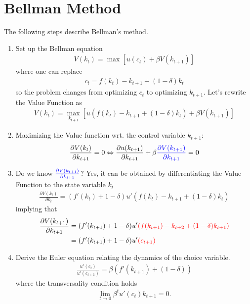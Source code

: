\documentclass[11pt,a4paper]{book}
\newcommand{\red}[1]{\textcolor{red}{#1}}
\newcommand{\blue}[1]{\textcolor{blue}{#1}}
\theoremstyle{definition}\newtheorem{definition}{Definition}
\theoremstyle{definition}\newtheorem{fact}{Fact}
\theoremstyle{definition}\newtheorem{remark}{Remark}
\theoremstyle{definition}\newtheorem{ex}{Ex.}
\theoremstyle{definition}\newtheorem{project}{Project}
\theoremstyle{definition}\newtheorem{problem}{Problem}
\theoremstyle{definition}\newtheorem{example}{Example}
\numberwithin{theorem}{section}
\numberwithin{corollary}{chapter}
\numberwithin{assumption}{chapter}
\numberwithin{definition}{chapter}
\numberwithin{prop}{chapter}
\numberwithin{notation}{chapter}
\numberwithin{problem}{chapter}
\numberwithin{example}{chapter}
\numberwithin{fact}{chapter}
\numberwithin{ex}{chapter}
\begin{document}
	\section{Bellman Method}
	The following steps describe Bellman's method.
	\begin{enumerate}
		\item Set up the Bellman equation
		\begin{align*}
			V(k_t) = \max \left[ u(c_t) + \beta V(k_{t+1}) \right]
		\end{align*}
		where one can replace
		\begin{align*}
			c_t = f(k_t) - k_{t+1} + (1-\delta) k_t
		\end{align*}
		so the problem changes from optimizing $c_t$ to optimizing $k_{t+1}$. Let's rewrite the Value Function as
		\begin{align*}
			V(k_t) = \max_{k_{t+1}} \left[ u(f(k_t) - k_{t+1} + (1-\delta)k_t) +\beta V(k_{t+1}) \right] 
		\end{align*}
		\item Maximizing the Value function wrt. the control variable $k_{t+1}$:
		\begin{align*}
			\frac{\partial V(k_t)}{\partial k_{t+1}} = 0 \Leftrightarrow \frac{\partial u(k_{t+1})}{\partial k_{t+1}} + \beta \blue{\frac{\partial V(k_{t+1})}{\partial k_{t+1}}} = 0 
		\end{align*}
		\item Do we know $\blue{\frac{\partial V(k_{t+1})}{\partial k_{t+1}}}$? Yes, it can be obtained by differentiating the Value Function to the state variable $k_t$
		\begin{align*}
			\frac{\partial V(k_t)}{\partial k_t} = (f'(k_t) + 1-\delta) u'( f(k_t) - k_{t+1} + (1-\delta)k_t ) 
		\end{align*}
		implying that
		\begin{align*}
			\frac{\partial V(k_{t+1})}{\partial k_{t+1}} &= (f'(k_{t+1}) + 1-\delta) u'\red{( f(k_{t+1}) - k_{t+2} + (1-\delta)k_{t+1} )} \\
			&= (f'(k_{t+1}) + 1-\delta)u'\red{ (c_{t+1})}
		\end{align*}
		\item Derive the Euler equation relating the dynamics of the choice variable.
		\begin{align*}
			\frac{u'(c_t)}{u'(c_{t+1})} = \beta (f'(k_{t+1}) + (1-\delta))
		\end{align*}
		where the transversality condition holds
		\begin{align*}
			\lim_{t\to 0} \beta^t u'(c_t) k_{t+1} = 0.
		\end{align*}
	\end{enumerate}
	
\end{document}

